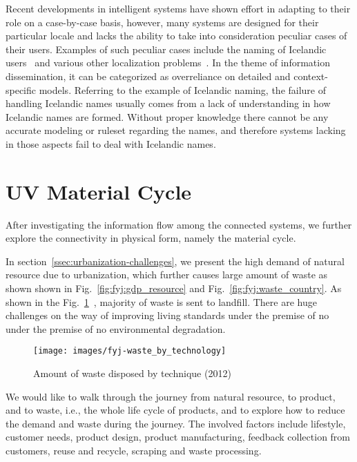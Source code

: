 \documentclass[letterpaper, twocolumn, 10pt, conference]{IEEEtran}
\begin{document}
Recent developments in intelligent systems have shown effort in adapting to their role on a case-by-case basis, however, many systems are designed for their particular locale and lacks the ability to take into consideration peculiar cases of their users. Examples of such peculiar cases include the naming of Icelandic users~\cite{scott2014names} and various other localization problems~\cite{computerphile2014internationalizing,computerphile2014problem}. In the theme of information dissemination, it can be categorized as overreliance on detailed and context-specific models. Referring to the example of Icelandic naming, the failure of handling Icelandic names usually comes from a lack of understanding in how Icelandic names are formed. Without proper knowledge there cannot be any accurate modeling or ruleset regarding the names, and therefore systems lacking in those aspects fail to deal with Icelandic names.


\section{UV Material Cycle}
\label{sec:UVMaterialCycle}

After investigating the information flow among the connected systems, we further explore the connectivity in physical form,  namely the  material cycle. 

In section~\ref{ssec:urbanization-challenges}, we present the high demand of natural resource due to urbanization, which further causes large amount of waste as shown  shown  in Fig.~\ref{fig:fyj:gdp_resource} and  Fig.~\ref{fig:fyj:waste_country}. As shown in the Fig.~\ref{fig:fyj:waste_technology}~\cite{UN-world-energy-report}, majority of waste is sent to landfill. There are huge challenges on the way of improving living standards under the premise of no under the premise of no environmental degradation.


\begin{figure}[h!]
        \centering
        \texttt{[image: images/fyj-waste\_by\_technology]}
        \caption{Amount of waste disposed by technique (2012)}
        \label{fig:fyj:waste_technology}
\end{figure}


We would like to walk through the journey from natural resource, to product, and to waste, i.e., the whole life cycle of products, and to explore how to reduce the demand and waste during the journey. The involved factors include lifestyle, customer needs, product design, product manufacturing, feedback collection from customers, reuse and recycle, scraping and waste processing. 
\end{document}
